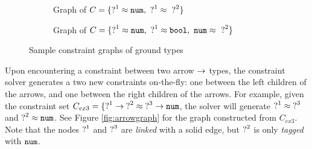 \begin{figure}[h!]
\centering
\begin{subfigure}{.49\textwidth}
  \centering
  \caption{Graph of $C = \{ \mathtt{?}^{1} \approx \mathtt{num}, ~ \mathtt{?}^{1} \approx~ \mathtt{?}^{2}\}$}
  \label{fig:sub1}
\end{subfigure}
\begin{subfigure}{.49\textwidth}
  \centering
  \caption{Graph of $C = \{ \mathtt{?}^1 \approx \mathtt{num}, ~ \mathtt{?}^1 \approx \mathtt{bool}, ~ \mathtt{num} \approx~ \mathtt{?}^2\}$}
  \label{fig:sub2}
\end{subfigure}
\caption{Sample constraint graphs of ground types}
\label{fig:ex1ex2graphs}
\end{figure}

Upon encountering a constraint between two arrow $\rightarrow$ types, the constraint solver generates a two new constraints on-the-fly: one between the left children of the arrows, and one between the right children of the arrows. For example, given the constraint set $C_{ex3} = \{ \mathtt{?}^1 \rightarrow \mathtt{?}^2 \approx \mathtt{?}^3 \rightarrow \mathtt{num}$, the solver will generate $\mathtt{?}^1 \approx \mathtt{?}^3$ and $\mathtt{?}^2 \approx \mathtt{num}$. See Figure \ref{fig:arrowgraph} for the graph constructed from $C_{ex3}$. Note that the nodes $\mathtt{?}^1$ and $\mathtt{?}^3$ are \textit{linked} with a solid edge, but $\mathtt{?}^2$ is only \textit{tagged} with $\mathtt{num}$.

